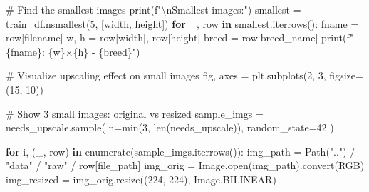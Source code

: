 \documentclass[
  letterpaper,
  DIV=11,
  numbers=noendperiod]{scrartcl}
\newenvironment{Shaded}{\begin{snugshade}}{\end{snugshade}}
\newcommand{\BuiltInTok}[1]{\textcolor[rgb]{0.00,0.23,0.31}{#1}}
\newcommand{\CharTok}[1]{\textcolor[rgb]{0.13,0.47,0.30}{#1}}
\newcommand{\CommentTok}[1]{\textcolor[rgb]{0.37,0.37,0.37}{#1}}
\newcommand{\ControlFlowTok}[1]{\textcolor[rgb]{0.00,0.23,0.31}{\textbf{#1}}}
\newcommand{\DecValTok}[1]{\textcolor[rgb]{0.68,0.00,0.00}{#1}}
\newcommand{\KeywordTok}[1]{\textcolor[rgb]{0.00,0.23,0.31}{\textbf{#1}}}
\newcommand{\NormalTok}[1]{\textcolor[rgb]{0.00,0.23,0.31}{#1}}
\newcommand{\OperatorTok}[1]{\textcolor[rgb]{0.37,0.37,0.37}{#1}}
\newcommand{\SpecialCharTok}[1]{\textcolor[rgb]{0.37,0.37,0.37}{#1}}
\newcommand{\SpecialStringTok}[1]{\textcolor[rgb]{0.13,0.47,0.30}{#1}}
\newcommand{\StringTok}[1]{\textcolor[rgb]{0.13,0.47,0.30}{#1}}
\renewenvironment{Shaded}{%
  \begin{tcolorbox}[%
    enhanced,%
    colback=codebg,%
    colframe=codebg,%
    borderline west={3pt}{0pt}{sectionblue},%
    boxrule=0pt,%
    arc=0pt,%
    boxsep=5pt,%
    left=2mm,%
    right=2mm,%
    top=2mm,%
    bottom=2mm%
  ]%
}{%
  \end{tcolorbox}%
}
\begin{document}
\begin{Shaded}
\begin{Highlighting}[]
\CommentTok{\# Find the smallest images}
\BuiltInTok{print}\NormalTok{(}\SpecialStringTok{f"}\CharTok{\textbackslash{}n}\SpecialStringTok{Smallest images:"}\NormalTok{)}
\NormalTok{smallest }\OperatorTok{=}\NormalTok{ train\_df.nsmallest(}\DecValTok{5}\NormalTok{, [}\StringTok{\textquotesingle{}width\textquotesingle{}}\NormalTok{, }\StringTok{\textquotesingle{}height\textquotesingle{}}\NormalTok{])}
\ControlFlowTok{for}\NormalTok{ \_, row }\KeywordTok{in}\NormalTok{ smallest.iterrows():}
\NormalTok{    fname }\OperatorTok{=}\NormalTok{ row[}\StringTok{\textquotesingle{}filename\textquotesingle{}}\NormalTok{]}
\NormalTok{    w, h }\OperatorTok{=}\NormalTok{ row[}\StringTok{\textquotesingle{}width\textquotesingle{}}\NormalTok{], row[}\StringTok{\textquotesingle{}height\textquotesingle{}}\NormalTok{]}
\NormalTok{    breed }\OperatorTok{=}\NormalTok{ row[}\StringTok{\textquotesingle{}breed\_name\textquotesingle{}}\NormalTok{]}
    \BuiltInTok{print}\NormalTok{(}\SpecialStringTok{f"  }\SpecialCharTok{\{}\NormalTok{fname}\SpecialCharTok{\}}\SpecialStringTok{: }\SpecialCharTok{\{}\NormalTok{w}\SpecialCharTok{\}}\SpecialStringTok{×}\SpecialCharTok{\{}\NormalTok{h}\SpecialCharTok{\}}\SpecialStringTok{ {-} }\SpecialCharTok{\{}\NormalTok{breed}\SpecialCharTok{\}}\SpecialStringTok{"}\NormalTok{)}

\CommentTok{\# Visualize upscaling effect on small images}
\NormalTok{fig, axes }\OperatorTok{=}\NormalTok{ plt.subplots(}\DecValTok{2}\NormalTok{, }\DecValTok{3}\NormalTok{, figsize}\OperatorTok{=}\NormalTok{(}\DecValTok{15}\NormalTok{, }\DecValTok{10}\NormalTok{))}

\CommentTok{\# Show 3 small images: original vs resized}
\NormalTok{sample\_imgs }\OperatorTok{=}\NormalTok{ needs\_upscale.sample(}
\NormalTok{    n}\OperatorTok{=}\BuiltInTok{min}\NormalTok{(}\DecValTok{3}\NormalTok{, }\BuiltInTok{len}\NormalTok{(needs\_upscale)), }
\NormalTok{    random\_state}\OperatorTok{=}\DecValTok{42}
\NormalTok{)}

\ControlFlowTok{for}\NormalTok{ i, (\_, row) }\KeywordTok{in} \BuiltInTok{enumerate}\NormalTok{(sample\_imgs.iterrows()):}
\NormalTok{    img\_path }\OperatorTok{=}\NormalTok{ Path(}\StringTok{".."}\NormalTok{) }\OperatorTok{/} \StringTok{"data"} \OperatorTok{/} \StringTok{"raw"} \OperatorTok{/}\NormalTok{ row[}\StringTok{\textquotesingle{}file\_path\textquotesingle{}}\NormalTok{]}
\NormalTok{    img\_orig }\OperatorTok{=}\NormalTok{ Image.}\BuiltInTok{open}\NormalTok{(img\_path).convert(}\StringTok{\textquotesingle{}RGB\textquotesingle{}}\NormalTok{)}
\NormalTok{    img\_resized }\OperatorTok{=}\NormalTok{ img\_orig.resize((}\DecValTok{224}\NormalTok{, }\DecValTok{224}\NormalTok{), Image.BILINEAR)}
    

\end{Highlighting}
\end{Shaded}
\end{document}
